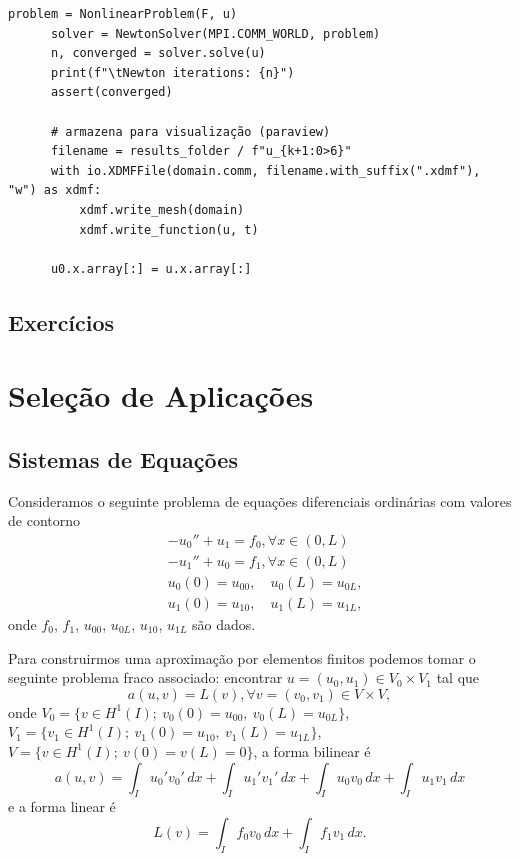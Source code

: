 \begin{ex}
\begin{lstlisting}[caption=ex\_mef1d\_fisher.py]
      problem = NonlinearProblem(F, u)
      solver = NewtonSolver(MPI.COMM_WORLD, problem)
      n, converged = solver.solve(u)
      print(f"\tNewton iterations: {n}")
      assert(converged)
  
      # armazena para visualização (paraview)
      filename = results_folder / f"u_{k+1:0>6}"
      with io.XDMFFile(domain.comm, filename.with_suffix(".xdmf"), "w") as xdmf:
          xdmf.write_mesh(domain)
          xdmf.write_function(u, t)
  
      u0.x.array[:] = u.x.array[:]  
\end{lstlisting}
\end{ex}

\subsection{Exercícios}


\section{Seleção de Aplicações}\label{cap_mef1d_sec_aps}

\subsection{Sistemas de Equações}

Consideramos o seguinte problema de equações diferenciais ordinárias com valores de contorno
\begin{align}
  &-u_0'' + u_1 = f_0,\forall x\in (0, L)\\ 
  &-u_1'' + u_0 = f_1,\forall x\in (0, L)\\
  &u_0(0)=u_{00},\quad u_0(L)=u_{0L},\\
  &u_1(0)=u_{10},\quad u_1(L)=u_{1L},
\end{align}
onde $f_0$, $f_1$, $u_{00}$, $u_{0L}$, $u_{10}$, $u_{1L}$ são dados.

Para construirmos uma aproximação por elementos finitos podemos tomar o seguinte problema fraco associado: encontrar $u = (u_0, u_1)\in V_0\times V_1$ tal que
\begin{equation}
  a(u, v) = L(v), \forall v = (v_0, v_1)\in V\times V,
\end{equation}
onde $V_0 = \{v\in H^1(I);~v_0(0)=u_{00},~v_0(L)=u_{0L}\}$, $V_1=\{v_1\in H^1(I);~v_1(0)=u_{10},~v_1(L)=u_{1L}\}$, $V = \{v\in H^1(I);~v(0)=v(L)=0\}$, a forma bilinear é
\begin{equation}\label{eq:sis_lin_bilinear}
  a(u, v) = \int_{I} u_0'v_0'\,dx + \int_{I} u_1'v_1'\,dx + \int_{I} u_0v_0\,dx + \int_{I} u_1v_1\,dx
\end{equation}
e a forma linear é
\begin{equation}\label{eq:sis_lin_linear}
  L(v) = \int_I f_0v_0\,dx + \int_I f_1v_1\,dx.
\end{equation}

